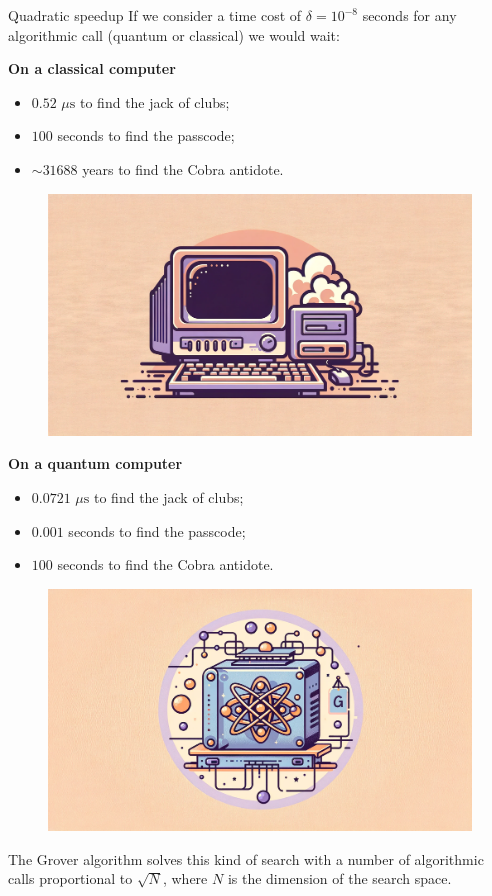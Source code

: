 \documentclass[aspectratio=169, 8pt, xcolor={svgnames}, hyperref={linkcolor=black}]{beamer}
\begin{document}
\begin{frame}{Quadratic speedup}
If we consider a time cost of $\delta=10^{-8}$ seconds for any algorithmic call (quantum or classical) we would wait:
\begin{multicols}{2}
\textbf{On a classical computer}
\begin{itemize}[noitemsep]
\item[\footnotesize\faCircle] $0.52\,\,\mu \text{s}$ to find the jack of clubs;
\item[\footnotesize\faCircle] $100$ seconds to find the passcode;
\item[\footnotesize\faCircle] $\sim 31688$ years to find the Cobra antidote.
\end{itemize}
\begin{figure}
    \includegraphics[width=.35\textwidth]{figures/ccomp.png}
\end{figure}

\textbf{On a quantum computer}
\begin{itemize}[noitemsep]
\item[\footnotesize\faCircle] $0.0721\,\,\mu \text{s}$ to find the jack of clubs;
\item[\footnotesize\faCircle] $0.001$ seconds to find the passcode;
\item[\footnotesize\faCircle] $100$ seconds to find the Cobra antidote.
\end{itemize}
\begin{figure}
    \includegraphics[width=.35\textwidth]{figures/qcomp.png}
\end{figure}
\end{multicols}
\begin{tcolorbox}[colback=red!15]
The Grover algorithm solves this kind of search with a number of algorithmic calls
proportional to $\sqrt{N}$, where $N$ is the dimension of the search space.
\end{tcolorbox}
\end{frame}
\end{document}
